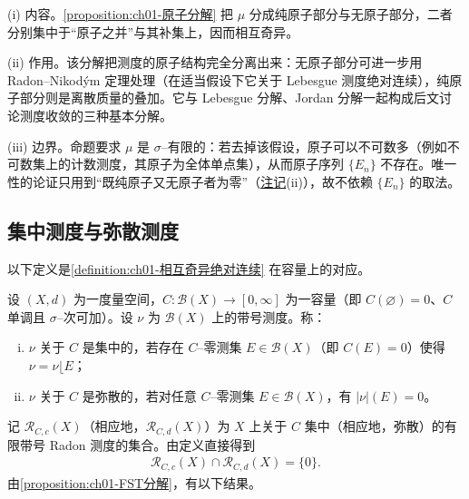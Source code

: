 \documentclass[../../main.tex]{subfiles}%
\begin{document}
\begin{remark}\label{remark:ch01-原子分解动机}
(i) 内容。\cref{proposition:ch01-原子分解} 把 $\mu$ 分成纯原子部分与无原子部分，二者分别集中于“原子之并”与其补集上，因而相互奇异。

(ii) 作用。该分解把测度的原子结构完全分离出来：无原子部分可进一步用 Radon--Nikodým 定理处理（在适当假设下它关于 Lebesgue 测度绝对连续），纯原子部分则是离散质量的叠加。它与 Lebesgue 分解、Jordan 分解一起构成后文讨论测度收敛的三种基本分解。

(iii) 边界。命题要求 $\mu$ 是 $\sigma$--有限的：若去掉该假设，原子可以不可数多（例如不可数集上的计数测度，其原子为全体单点集），从而原子序列 $\{E_n\}$ 不存在。唯一性的论证只用到“既纯原子又无原子者为零”（\hyperref[remark:ch01-原子注记]{注记}(ii)），故不依赖 $\{E_n\}$ 的取法。
\end{remark}

\subsection{集中测度与弥散测度}\label{subsection:ch01-集中弥散}

以下定义是\cref{definition:ch01-相互奇异绝对连续} 在容量上的对应。

\begin{definition}\label{definition:ch01-集中弥散}
设 $(X,d)$ 为一度量空间，$C:\mathcal{B}(X)\to[0,\infty]$ 为一容量（即 $C(\varnothing)=0$、$C$ 单调且 $\sigma$--次可加）。设 $\nu$ 为 $\mathcal{B}(X)$ 上的带号测度。称：
\begin{enumerate}[(i)]
\item $\nu$ 关于 $C$ 是集中的，若存在 $C$--零测集 $E\in\mathcal{B}(X)$（即 $C(E)=0$）使得 $\nu=\nu\lfloor E$；
\item $\nu$ 关于 $C$ 是弥散的，若对任意 $C$--零测集 $E\in\mathcal{B}(X)$，有 $|\nu|(E)=0$。
\end{enumerate}
\end{definition}

记 $\mathscr{R}_{C,c}(X)$（相应地，$\mathscr{R}_{C,d}(X)$）为 $X$ 上关于 $C$ 集中（相应地，弥散）的有限带号 Radon 测度的集合。由定义直接得到
\begin{align*}
\mathscr{R}_{C,c}(X)\cap\mathscr{R}_{C,d}(X)=\{0\}.
\end{align*}
由\cref{proposition:ch01-FST分解}，有以下结果。
\end{document}
